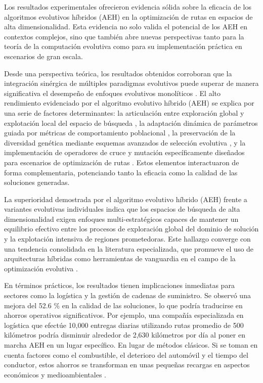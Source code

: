 \documentclass[conference]{IEEEtran}
\begin{document}
Los resultados experimentales ofrecieron evidencia sólida sobre la eficacia de los algoritmos evolutivos híbridos (AEH) en la optimización de rutas en espacios de alta dimensionalidad. Esta evidencia no solo valida el potencial de los AEH en contextos complejos, sino que también abre nuevas perspectivas tanto para la teoría de la computación evolutiva como para su implementación práctica en escenarios de gran escala.

Desde una perspectiva teórica, los resultados obtenidos corroboran que la integración sinérgica de múltiples paradigmas evolutivos puede superar de manera significativa el desempeño de enfoques evolutivos monolíticos \cite{talbi2002,coello2007}. El alto rendimiento evidenciado por el algoritmo evolutivo híbrido (AEH) se explica por una serie de factores determinantes: la articulación entre exploración global y explotación local del espacio de búsqueda \cite{blum2003,voudouris2003}, la adaptación dinámica de parámetros guiada por métricas de comportamiento poblacional \cite{brest2006,zhang2008}, la preservación de la diversidad genética mediante esquemas avanzados de selección evolutiva \cite{blickle1996}, y la implementación de operadores de cruce y mutación específicamente diseñados para escenarios de optimización de rutas \cite{toth2014,rego2011}. Estos elementos interactuaron de forma complementaria, potenciando tanto la eficacia como la calidad de las soluciones generadas.

La superioridad demostrada por el algoritmo evolutivo híbrido (AEH) frente a variantes evolutivas individuales indica que los espacios de búsqueda de alta dimensionalidad exigen enfoques multi-estratégicos capaces de mantener un equilibrio efectivo entre los procesos de exploración global del dominio de solución y la explotación intensiva de regiones prometedoras. Este hallazgo converge con una tendencia consolidada en la literatura especializada, que promueve el uso de arquitecturas híbridas como herramientas de vanguardia en el campo de la optimización evolutiva \cite{talbi2002}.

En términos prácticos, los resultados tienen implicaciones inmediatas para sectores como la logística y la gestión de cadenas de suministro. Se observó una mejora del 52.6 \% en la calidad de las soluciones, lo que podría traducirse en ahorros operativos significativos. Por ejemplo, una compañía especializada en logística que efectúe 10,000 entregas diarias utilizando rutas promedio de 500 kilómetros podría disminuir alrededor de
2,630 kilómetros por día al poner en marcha AEH en un lugar específico.
En lugar de métodos clásicos. Si se toman en cuenta factores como el combustible, el deterioro del automóvil y el tiempo del conductor, estos ahorros se transforman en unas pequeñas recargas en aspectos económicos y medioambientales \cite{toth2014}.
\end{document}
